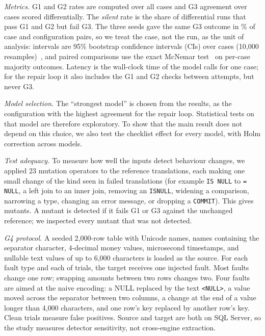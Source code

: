 \textit{Metrics.} G1 and G2 rates are computed over all cases and G3 agreement over cases scored
differentially. The \emph{silent} rate is the share of differential runs that pass G1 and G2 but fail G3.
The three seeds gave the same G3 outcome in \RepAgreement\% of case and configuration pairs, so we treat the
case, not the run, as the unit of analysis: intervals are 95\% bootstrap confidence intervals (CIs) over
cases (10{,}000 resamples)~\cite{efron1993}, and paired comparisons use the exact McNemar
test~\cite{mcnemar1947} on per-case majority outcomes. Latency is the wall-clock time of the model calls
for one case; for the repair loop it also includes the G1 and G2 checks between attempts, but never G3.

\textit{Model selection.} The ``strongest model'' is chosen from the results, as the configuration with the
highest agreement for the repair loop. Statistical tests on that model are therefore exploratory. To show
that the main result does not depend on this choice, we also test the checklist effect for every model,
with Holm correction across models.

\textit{Test adequacy.} To measure how well the inputs detect behaviour changes, we applied 23 mutation
operators to the reference translations, each making one small change of the kind seen in failed
translations (for example \texttt{IS NULL} to \texttt{= NULL}, a left join to an inner join, removing an
\texttt{ISNULL}, widening a comparison, narrowing a type, changing an error message, or dropping a
\texttt{COMMIT}). This gives \MutTotal{} mutants. A mutant is detected if it fails G1 or G3 against the
unchanged reference; we inspected every mutant that was not detected.

\textit{G4 protocol.} A seeded 2{,}000-row table with Unicode names, names containing the separator
character, 4-decimal money values, microsecond timestamps, and nullable text values of up to 6{,}000
characters is loaded as the source. For each fault type and each of \RecTrials{} trials, the target
receives one injected fault. Most faults change one row; swapping amounts between two rows changes two.
Four faults are aimed at the naive encoding: a NULL replaced by the text \texttt{<NULL>}, a value moved
across the separator between two columns, a change at the end of a value longer than 4{,}000 characters,
and one row's key replaced by another row's key. Clean trials measure false positives. Source and target
are both on SQL Server, so the study measures detector sensitivity, not cross-engine extraction.
